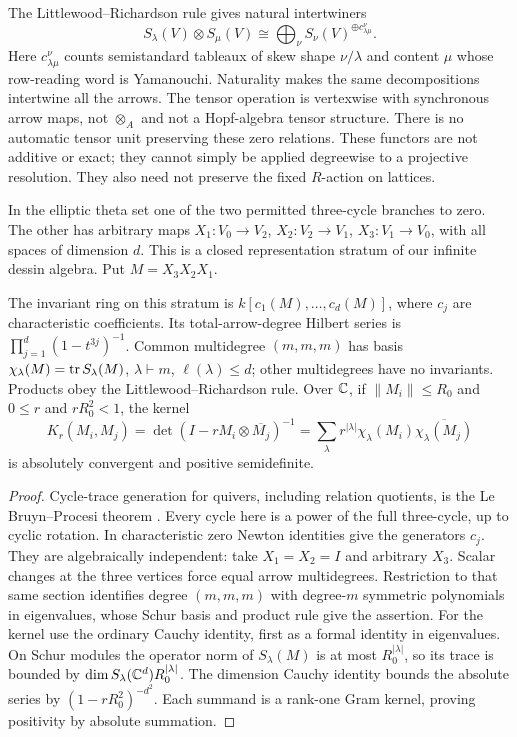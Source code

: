 The Littlewood--Richardson rule gives natural intertwiners
\[
 S_\lambda(V)\otimes S_\mu(V)\cong
 \bigoplus_\nu S_\nu(V)^{\oplus c_{\lambda\mu}^{\nu}}.
\]
Here $c_{\lambda\mu}^{\nu}$ counts semistandard tableaux of skew shape $\nu/\lambda$ and content $\mu$ whose row-reading word is Yamanouchi. Naturality makes the same decompositions intertwine all the arrows. The tensor operation is vertexwise with synchronous arrow maps, not $\otimes_A$ and not a Hopf-algebra tensor structure. There is no automatic tensor unit preserving these zero relations. These functors are not additive or exact; they cannot simply be applied degreewise to a projective resolution. They also need not preserve the fixed $R$-action on lattices.

In the elliptic theta set one of the two permitted three-cycle branches to zero. The other has arbitrary maps $X_1:V_0\to V_2$, $X_2:V_2\to V_1$, $X_3:V_1\to V_0$, with all spaces of dimension $d$. This is a closed representation stratum of our infinite dessin algebra. Put $M=X_3X_2X_1$.
\begin{theorem}\label{thm:schur}
The invariant ring on this stratum is $k[c_1(M),\ldots,c_d(M)]$, where $c_j$ are characteristic coefficients. Its total-arrow-degree Hilbert series is $\prod_{j=1}^d(1-t^{3j})^{-1}$. Common multidegree $(m,m,m)$ has basis $\chi_\lambda(M)=\operatorname{tr} S_\lambda(M)$, $\lambda\vdash m$, $\ell(\lambda)\le d$; other multidegrees have no invariants. Products obey the Littlewood--Richardson rule. Over $\mathbb C$, if $\|M_i\|\le R_0$ and $0\le r$ and $rR_0^2<1$, the kernel
\[
 K_r(M_i,M_j)=\det(I-rM_i\otimes\overline{M_j})^{-1}
 =\sum_\lambda r^{|\lambda|}\chi_\lambda(M_i)\overline{\chi_\lambda(M_j)}
\]
is absolutely convergent and positive semidefinite.
\end{theorem}
\begin{proof}
Cycle-trace generation for quivers, including relation quotients, is the Le Bruyn--Procesi theorem \cite{LeBruynProcesi,CrawYamagishi}. Every cycle here is a power of the full three-cycle, up to cyclic rotation. In characteristic zero Newton identities give the generators $c_j$. They are algebraically independent: take $X_1=X_2=I$ and arbitrary $X_3$. Scalar changes at the three vertices force equal arrow multidegrees. Restriction to that same section identifies degree $(m,m,m)$ with degree-$m$ symmetric polynomials in eigenvalues, whose Schur basis and product rule give the assertion. For the kernel use the ordinary Cauchy identity, first as a formal identity in eigenvalues. On Schur modules the operator norm of $S_\lambda(M)$ is at most $R_0^{|\lambda|}$, so its trace is bounded by $\dim S_\lambda(\mathbb C^d)R_0^{|\lambda|}$. The dimension Cauchy identity bounds the absolute series by $(1-rR_0^2)^{-d^2}$. Each summand is a rank-one Gram kernel, proving positivity by absolute summation.
\end{proof}
